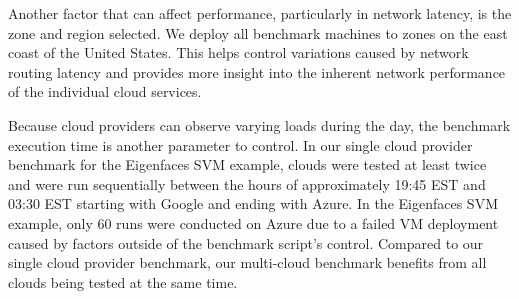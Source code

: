 Another factor that can affect performance, particularly in network
latency, is the zone and region selected. We deploy all benchmark
machines to zones on the east coast of the United States. This helps
control variations caused by network routing latency and provides more
insight into the inherent network performance of the individual cloud
services.


Because cloud providers can observe varying loads during the day, the benchmark execution time is another parameter to control. In our single cloud provider benchmark for the Eigenfaces SVM example, clouds were tested at least twice and were run sequentially between the hours of approximately 19:45 EST and 03:30 EST starting with Google and ending with Azure. In the Eigenfaces SVM example, only 60 runs were
conducted on Azure due to a failed VM deployment caused by factors outside of the benchmark script's control. Compared to our single cloud provider benchmark, our multi-cloud benchmark benefits from all clouds being tested at the same time.

